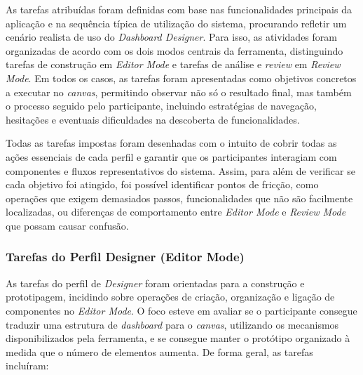 As tarefas atribuídas foram definidas com base nas funcionalidades principais da aplicação e na sequência típica de utilização do sistema, procurando refletir um cenário realista de uso do \textit{Dashboard Designer}. Para isso, as atividades foram organizadas de acordo com os dois modos centrais da ferramenta, distinguindo tarefas de construção em \textit{Editor Mode} e tarefas de análise e \textit{review} em \textit{Review Mode}. Em todos os casos, as tarefas foram apresentadas como objetivos concretos a executar no \textit{canvas}, permitindo observar não só o resultado final, mas também o processo seguido pelo participante, incluindo estratégias de navegação, hesitações e eventuais dificuldades na descoberta de funcionalidades.

Todas as tarefas impostas foram desenhadas com o intuito de cobrir todas as ações essenciais de cada perfil e garantir que os participantes interagiam com componentes e fluxos representativos do sistema. Assim, para além de verificar se cada objetivo foi atingido, foi possível identificar pontos de fricção, como operações que exigem demasiados passos, funcionalidades que não são facilmente localizadas, ou diferenças de comportamento entre \textit{Editor Mode} e \textit{Review Mode} que possam causar confusão.

\subsubsection{Tarefas do Perfil Designer (Editor Mode)}
\label{subsubsec:cap5_tasks_designer}

As tarefas do perfil de \textit{Designer} foram orientadas para a construção e prototipagem, incidindo sobre operações de criação, organização e ligação de componentes no \textit{Editor Mode}. O foco esteve em avaliar se o participante consegue traduzir uma estrutura de \textit{dashboard} para o \textit{canvas}, utilizando os mecanismos disponibilizados pela ferramenta, e se consegue manter o protótipo organizado à medida que o número de elementos aumenta. De forma geral, as tarefas incluíram:

